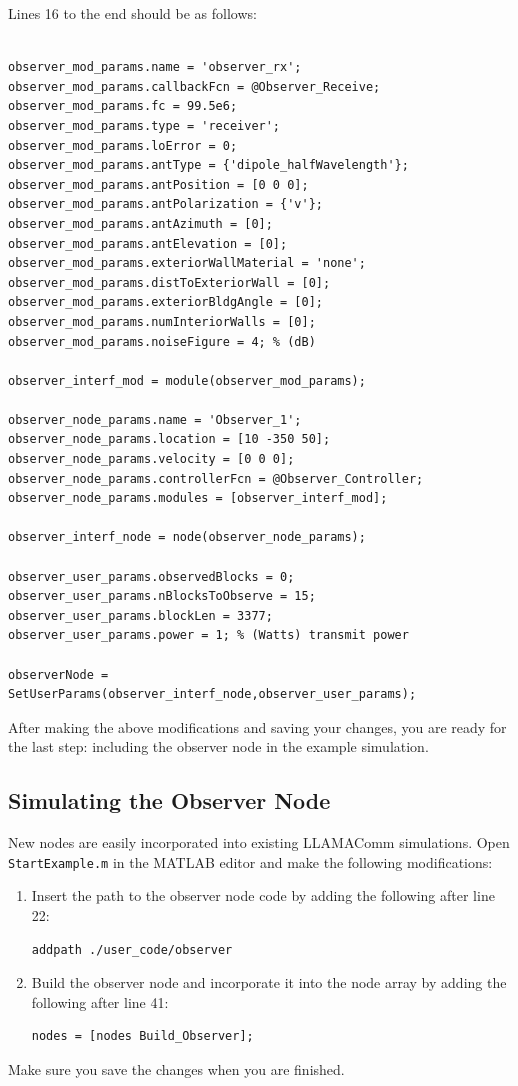 Lines 16 to the end should be as follows:
%
\begin{lstlisting}[firstnumber = 16]
% Build observer node

observer_mod_params.name = 'observer_rx';
observer_mod_params.callbackFcn = @Observer_Receive;
observer_mod_params.fc = 99.5e6;
observer_mod_params.type = 'receiver';
observer_mod_params.loError = 0;
observer_mod_params.antType = {'dipole_halfWavelength'};
observer_mod_params.antPosition = [0 0 0];
observer_mod_params.antPolarization = {'v'};
observer_mod_params.antAzimuth = [0];
observer_mod_params.antElevation = [0];
observer_mod_params.exteriorWallMaterial = 'none';
observer_mod_params.distToExteriorWall = [0];
observer_mod_params.exteriorBldgAngle = [0];
observer_mod_params.numInteriorWalls = [0];
observer_mod_params.noiseFigure = 4; % (dB)

observer_interf_mod = module(observer_mod_params);

observer_node_params.name = 'Observer_1';
observer_node_params.location = [10 -350 50];
observer_node_params.velocity = [0 0 0];
observer_node_params.controllerFcn = @Observer_Controller;
observer_node_params.modules = [observer_interf_mod];

observer_interf_node = node(observer_node_params);

observer_user_params.observedBlocks = 0;
observer_user_params.nBlocksToObserve = 15;
observer_user_params.blockLen = 3377;
observer_user_params.power = 1; % (Watts) transmit power

observerNode = SetUserParams(observer_interf_node,observer_user_params);
\end{lstlisting}
%

After making the above modifications and saving your changes, you are ready for the last step: including the observer node in the example simulation.

\subsection{Simulating the Observer Node}

New nodes are easily incorporated into existing LLAMAComm simulations.  Open \verb+StartExample.m+ in the MATLAB editor and make the following modifications:

\begin{enumerate}
\item  Insert the path to the observer node code by adding the following after line 22:

\begin{lstlisting}[numbers=none]
addpath ./user_code/observer
\end{lstlisting}

\item Build the observer node and incorporate it into the node array by adding the following after line 41:

\begin{lstlisting}[numbers=none]
nodes = [nodes Build_Observer];
\end{lstlisting}

\end{enumerate}
Make sure you save the changes when you are finished.

